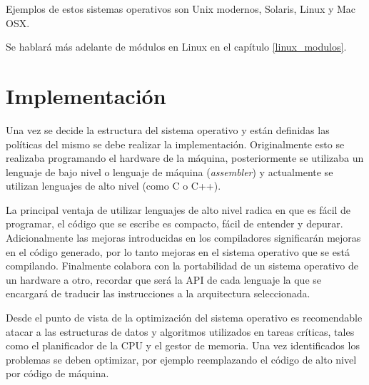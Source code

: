 Ejemplos de estos sistemas operativos son Unix modernos, Solaris, Linux y Mac
OSX.

Se hablará más adelante de módulos en Linux en el capítulo \ref{linux_modulos}.

\section{Implementación}
Una vez se decide la estructura del sistema operativo y están definidas las
políticas del mismo se debe realizar la implementación. Originalmente esto se
realizaba programando el hardware de la máquina, posteriormente se utilizaba un
lenguaje de bajo nivel o lenguaje de máquina (\textit{assembler}) y actualmente
se utilizan lenguajes de alto nivel (como C o C++).

La principal ventaja de utilizar lenguajes de alto nivel radica en que es fácil
de programar, el código que se escribe es compacto, fácil de entender y depurar.
Adicionalmente las mejoras introducidas en los compiladores significarán mejoras
en el código generado, por lo tanto mejoras en el sistema operativo que se está
compilando. Finalmente colabora con la portabilidad de un sistema operativo de
un hardware a otro, recordar que será la API de cada lenguaje la que se
encargará de traducir las instrucciones a la arquitectura seleccionada.

Desde el punto de vista de la optimización del sistema operativo es recomendable
atacar a las estructuras de datos y algoritmos utilizados en tareas críticas,
tales como el planificador de la CPU y el gestor de memoria. Una vez
identificados los problemas se deben optimizar, por ejemplo reemplazando el
código de alto nivel por código de máquina.

